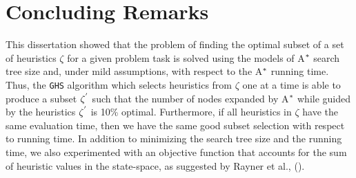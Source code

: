 
 
\chapter{Concluding Remarks}\label{ch:conclusions}

\iffalse
\chapterprecis{The purpose of this section is to introduce the meta-reasoning proposed.}\index{sinopse de capítulo}
\fi

\noindent
This dissertation showed that the problem of finding the optimal subset of a set of heuristics $\zeta$ for a given problem task is solved using the models of A$\sp{*}$ search tree size and, under mild assumptions, with respect to the A$\sp{*}$ running time. Thus, the \texttt{GHS} algorithm which selects heuristics from $\zeta$ one at a time is able to produce a subset $\zeta\sp{'}$ such that the number of nodes expanded by A$\sp{*}$ while guided by the heuristics $\zeta\sp{'}$ is 10\% optimal. Furthermore, if all heuristics in $\zeta$ have the same evaluation time, then we have the same good subset selection with respect to running time. In addition to minimizing the search tree size and the running time, we also experimented with an objective function that accounts for the sum of heuristic values in the state-space, as suggested by Rayner et al., (\citeyear{raynersss13}).

